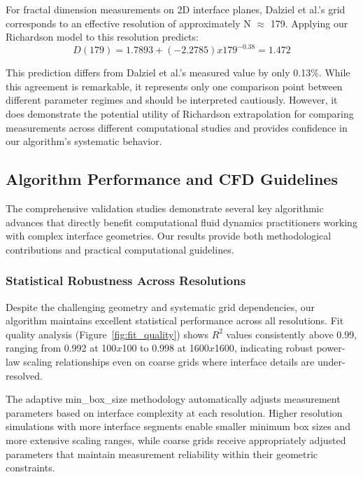 \documentclass[preprint,12pt]{elsarticle}
\def\times{x}%
\begin{document}
For fractal dimension measurements on 2D interface planes, Dalziel et al.'s grid corresponds to an effective resolution of approximately N $\approx$ 179. Applying our Richardson model to this resolution predicts:
\begin{equation}
D(179) = 1.7893 + (-2.2785) \times 179^{-0.38} = 1.472
\label{eq:dalziel_prediction}
\end{equation}

This prediction differs from Dalziel et al.'s measured value by only 0.13\%. While this agreement is remarkable, it represents only one comparison point between different parameter regimes and should be interpreted cautiously. However, it does demonstrate the potential utility of Richardson extrapolation for comparing measurements across different computational studies and provides confidence in our algorithm's systematic behavior.

\subsection{Algorithm Performance and CFD Guidelines}
\label{subsec:practical_impact}

The comprehensive validation studies demonstrate several key algorithmic advances that directly benefit computational fluid dynamics practitioners working with complex interface geometries. Our results provide both methodological contributions and practical computational guidelines.

\subsubsection{Statistical Robustness Across Resolutions}

Despite the challenging geometry and systematic grid dependencies, our algorithm maintains excellent statistical performance across all resolutions. Fit quality analysis (Figure~\ref{fig:fit_quality}) shows $R^2$ values consistently above 0.99, ranging from 0.992 at 100$\times$100 to 0.998 at 1600$\times$1600, indicating robust power-law scaling relationships even on coarse grids where interface details are under-resolved.

The adaptive min\_box\_size methodology automatically adjusts measurement parameters based on interface complexity at each resolution. Higher resolution simulations with more interface segments enable smaller minimum box sizes and more extensive scaling ranges, while coarse grids receive appropriately adjusted parameters that maintain measurement reliability within their geometric constraints.
\end{document}
